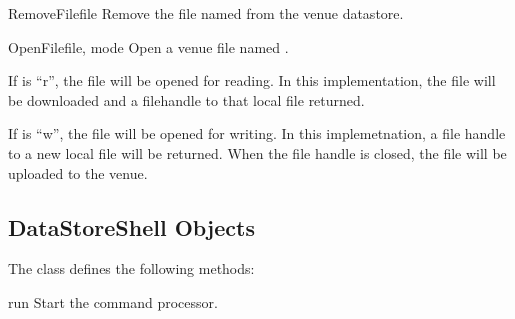 \documentclass{howto}
\begin{document}
\begin{methoddesc}{RemoveFile}{file}
Remove the file named  from the venue datastore.

\end{methoddesc}

\begin{methoddesc}{OpenFile}{file, mode}
Open a venue file named . 

If  is ``r'', the file
will be opened for reading. In this implementation, the file will be
downloaded and a filehandle to that local file returned. 

If  is ``w'', the file will be opened for writing. In this
implemetnation, a file handle to a new local file will be
returned. When the file handle is closed, the file will be uploaded to
the venue.

\end{methoddesc}

\subsection{DataStoreShell Objects}

The  class defines the following methods:

\begin{methoddesc}{run}{}
Start the command processor.

\end{methoddesc}

\renewcommand{\indexname}{Module Index}

\renewcommand{\indexname}{Index}
\end{document}
